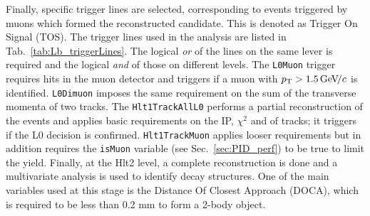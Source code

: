 Finally, specific trigger lines are selected, corresponding to events triggered by muons
which formed the reconstructed candidate. This is denoted as Trigger On Signal (TOS).
The trigger lines used in the analysis are listed in Tab.~\ref{tab:Lb_triggerLines}.
The logical {\em or } of the lines on the same lever is required and the logical {\em and }
of those on different levels.
The \verb!L0Muon! trigger requires hits in the muon detector and triggers if a muon with $\mbox{$p_{\rm T}$} > 1.5 {\mathrm{\,Ge\kern -0.1em V\!/}c}$ is identified.
\verb!L0Dimuon! imposes the same requirement on the sum of the transverse momenta of two tracks.
The \verb!Hlt1TrackAllL0! performs a partial reconstruction of the events and applies basic requirements on the
IP, $\chi^2$ and \pt of tracks; it triggers if the L0 decision is confirmed. \verb!Hlt1TrackMuon! applies looser requirements 
but in addition requires the \verb!isMuon! variable (see Sec.~\ref{sec:PID_perf}) to be true to limit the yield.
Finally, at the Hlt2 level, a complete reconstruction is done and a multivariate analysis is used to identify decay 
structures. One of the main variables used at this stage is the Distance Of Closest Approach (DOCA), which is 
required to be less than 0.2 mm to form a 2-body object.
%
\begin{table}[h]
\centering
\caption{Summary of trigger lines which candidates have to pass at various trigger levels.
Trigger is always required to be due to tracks of the candidate itself.}
\label{tab:Lb_triggerLines}
\end{table}
%


